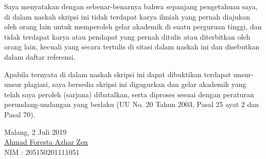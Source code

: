 \documentclass{skripsi}
\begin{document}
\cover

\approvalpage

{\orisinalitas

  Saya menyatakan dengan sebenar-benarnya bahwa sepanjang pengetahuan
  saya, di dalam naskah skripsi ini tidak terdapat karya ilmiah yang
  pernah diajukan oleh orang lain untuk memperoleh gelar akademik di
  suatu perguruan tinggi, dan tidak terdapat karya atau pendapat yang
  pernah ditulis atau diterbitkan oleh orang lain, kecuali yang secara
  tertulis di sitasi dalam naskah ini dan disebutkan dalam daftar
  referensi.

  Apabila ternyata di dalam naskah skripsi ini dapat dibuktikan
  terdapat unsur-unsur plagiasi, saya bersedia skripsi ini digugurkan
  dan gelar akademik yang telah saya peroleh (sarjana) dibatalkan,
  serta diproses sesuai dengan peraturan perundang-undangan yang
  berlaku (UU No. 20 Tahun 2003, Pasal 25 ayat 2 dan Pasal 70).
  \vspace{1.5cm}

  \noindent
  \hspace*{9cm}Malang, 2 Juli 2019
  \vspace{2.5cm}   \\
  \hspace*{9cm}\underline{Ahmad Foresta Azhar Zen} \\
  \hspace*{9cm}NIM : 205150201111051
}
\end{document}
